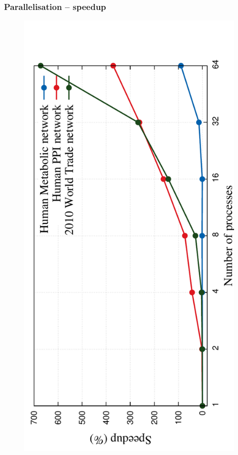 \documentclass[11pt,xcolor=table]{beamer}
\begin{document}
\begin{frame}
  \frametitle{Parallelisation -- speedup}


\begin{figure}[H]
  \centering
  \includegraphics[angle=-90,scale=0.45]{../code/final_results/parallelisation_results/nr_processes2}
  \label{fig:time_threads}
\end{figure}
  
\end{frame}
\end{document}
